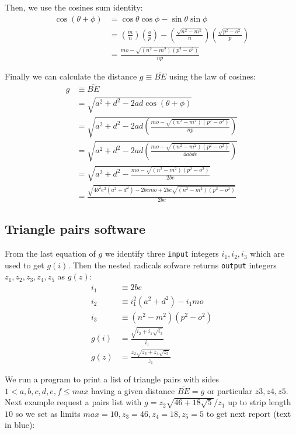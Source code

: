 \documentclass[11pt]{article}
\begin{document}
Then, we use the cosines sum identity:
\begin{align}
\cos(\theta+\phi) &= \cos\theta\cos\phi - \sin\theta\sin\phi \nonumber\\
 &= \left(\frac{m}n\right)\left(\frac{o}p\right)
  - \left(\frac{\sqrt{n^2 - m^2}}n\right)\left(\frac{\sqrt{p^2 - o^2}}p\right) \nonumber\\
 &= \frac{mo - \sqrt{(n^2 - m^2)(p^2 - o^2)}}{np}
\end{align}

Finally we can calculate the distance $g \equiv \overline{BE}$ using the law of cosines:
\begin{align}
g &\equiv \overline{BE}\nonumber\\
 &= \sqrt{a^2 + d^2 - 2ad\cos(\theta+\phi)}\nonumber\\
 &= \sqrt{a^2 + d^2 - 2ad\left(\frac{mo - \sqrt{(n^2 - m^2)(p^2 - o^2)}}{np}\right)}\nonumber\\
 &= \sqrt{a^2 + d^2 - 2ad\left(\frac{mo - \sqrt{(n^2 - m^2)(p^2 - o^2)}}{4abde}\right)}\nonumber\\
 &= \sqrt{a^2 + d^2 - \frac{mo - \sqrt{(n^2 - m^2)(p^2 - o^2)}}{2be}}\nonumber\\
 &= \frac{\sqrt{4b^2e^2(a^2 + d^2) - 2bemo + 2be\sqrt{(n^2 - m^2)(p^2 - o^2)}}}{2be}
\end{align}

\subsection{Triangle pairs software}

From the last equation of $g$ we identify three \texttt{input} integers $i_1,i_2,i_3$ which are used to get $g(i)$. Then the nested radicals sofware returns \texttt{output} integers $z_1,z_2,z_3,z_4,z_5$ as $g(z)$:
\begin{align}
i_1 &\equiv 2be\\
i_2 &\equiv i_1^2(a^2+d^2) - i_1mo\\
i_3 &\equiv (n^2-m^2)(p^2-o^2)\\
g(i) &= \frac{\sqrt{i_2 + i_1\sqrt{i_3}}}{i_1}\\
g(z) &= \frac{z_2\sqrt{z_3 + z_4\sqrt{z_5}}}{z_1}
\end{align}

We run a program to print a list of triangle pairs with sides $1 < a,b,c,d,e,f \leq max$ having a given distance $\overline{BE}=g$ or particular $z3,z4,z5$. Next example request a pairs list with $g = z_2\sqrt{46+18\sqrt{5}}/z_1$ up to strip length $10$ so we set as limits $max=10, z_3=46, z_4=18, z_5=5$ to get next report (text in blue):
\end{document}

